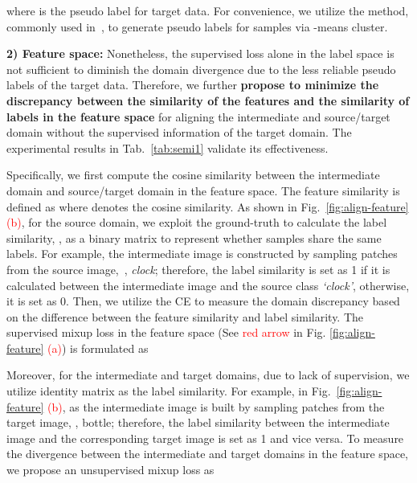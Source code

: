 \documentclass[10pt,twocolumn,letterpaper, ]{article}
\begin{document}
where  is the pseudo label for target data. For convenience, we utilize the method, commonly used in~\cite{LiangHF20, LiangHF21}, to generate pseudo labels  for samples via -means cluster. 

\textbf{2) Feature space:} Nonetheless, the supervised loss alone in the label space is
not sufficient to diminish the domain divergence due to the less reliable pseudo labels of the target data. 
Therefore, we further  \textbf{propose to minimize the discrepancy between the similarity of the features and the similarity of labels in the feature space} for aligning the intermediate and source/target domain without the supervised information of the target domain. The experimental results in Tab.~\ref{tab:semi1} validate its effectiveness.

Specifically, we first compute the cosine similarity between the intermediate domain and source/target domain in the feature space. The feature similarity is defined as
{\setlength\abovedisplayskip{3pt}
\setlength\belowdisplayskip{3pt}
}
where  denotes the cosine similarity. 
As shown in Fig.~\ref{fig:align-feature}\textcolor{red}{(b)}, for the source domain, we exploit the ground-truth to calculate the label similarity, , as a binary matrix to represent whether samples share the same labels. For example, the intermediate image is constructed by sampling patches from the source image,~\eg, \textit{clock}; therefore, the label similarity is set as 1 if it is calculated between the intermediate image and the source class \textit{`clock'}, otherwise, it is set as 0.
Then, we utilize the CE to measure the domain discrepancy based on the difference between the feature similarity and label similarity. The supervised mixup loss in the feature space (See \textcolor{red}{red arrow} in Fig. \ref{fig:align-feature} \textcolor{red}{(a)}) is formulated as
{\setlength\abovedisplayskip{3pt}
\setlength\belowdisplayskip{3pt}
\begin{small}

\end{small}
}
Moreover, for the intermediate and target domains, due to lack of supervision, we utilize identity matrix  as the label similarity. For example, in Fig.~\ref{fig:align-feature} \textcolor{red}{(b)}, as the intermediate image is built by sampling patches from the target image, \eg, bottle; therefore, the label similarity between the intermediate image and the corresponding target image is set as 1 and vice versa. 
To measure the divergence between the intermediate and target domains in the feature space, we propose an unsupervised mixup loss as
{\setlength\abovedisplayskip{3pt}
\setlength\belowdisplayskip{3pt}
\begin{small}

\end{small}}
\end{document}
